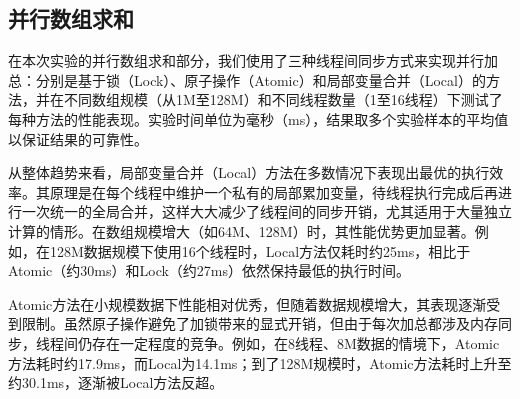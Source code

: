 \documentclass[a4paper, utf8]{ctexart}
\begin{document}
	\subsection{并行数组求和}
	
	在本次实验的并行数组求和部分，我们使用了三种线程间同步方式来实现并行加总：分别是基于锁（Lock）、原子操作（Atomic）和局部变量合并（Local）的方法，并在不同数组规模（从1M至128M）和不同线程数量（1至16线程）下测试了每种方法的性能表现。实验时间单位为毫秒（ms），结果取多个实验样本的平均值以保证结果的可靠性。
	
	从整体趋势来看，局部变量合并（Local）方法在多数情况下表现出最优的执行效率。其原理是在每个线程中维护一个私有的局部累加变量，待线程执行完成后再进行一次统一的全局合并，这样大大减少了线程间的同步开销，尤其适用于大量独立计算的情形。在数组规模增大（如64M、128M）时，其性能优势更加显著。例如，在128M数据规模下使用16个线程时，Local方法仅耗时约25ms，相比于Atomic（约30ms）和Lock（约27ms）依然保持最低的执行时间。
	
	Atomic方法在小规模数据下性能相对优秀，但随着数据规模增大，其表现逐渐受到限制。虽然原子操作避免了加锁带来的显式开销，但由于每次加总都涉及内存同步，线程间仍存在一定程度的竞争。例如，在8线程、8M数据的情境下，Atomic方法耗时约17.9ms，而Local为14.1ms；到了128M规模时，Atomic方法耗时上升至约30.1ms，逐渐被Local方法反超。
	
\end{document}

